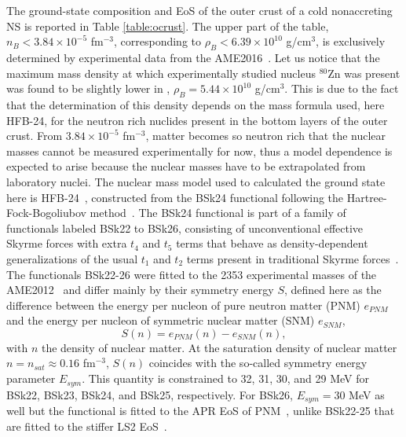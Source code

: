 The ground-state composition and EoS of the outer crust of a cold nonaccreting 
NS is reported in Table \ref{table:ocrust}. The upper part of the table, 
$n_B < 3.84 \times 10^{-5}$ fm$^{-3}$, {corresponding to $\rho_B < 6.39 \times
10^{10}$ g/cm$^3$}, is exclusively determined by experimental 
data from the AME2016~\cite{Huang2017}. {Let us notice that the maximum
  mass density at which experimentally studied nucleus $^{80}$Zn was present 
  was found to be slightly lower in \cite{Haensel1994}, 
  $\rho_B = 5.44 \times 10^{10}$ g/cm$^3$. This is due to the fact that the 
  determination of this density depends on the mass formula used, here
  HFB-24, for the neutron rich nuclides present in the bottom layers of the
outer crust.} From $3.84\times 10^{-5}$ 
fm$^{-3}$, matter becomes so neutron rich that the nuclear masses cannot be measured 
experimentally for now, thus a model dependence is expected 
to arise because the nuclear masses have to be extrapolated from laboratory nuclei. The
nuclear mass model used to calculated the ground state here is
HFB-24~\cite{Goriely2013}, constructed from the BSk24 functional following the
Hartree-Fock-Bogoliubov method~\cite{Samyn2002}. {The BSk24 functional is part
of a family of functionals labeled BSk22 to BSk26, consisting of unconventional
effective Skyrme forces with extra $t_4$ and $t_5$ terms that behave as
density-dependent generalizations of the usual $t_1$ and $t_2$ terms present in
traditional Skyrme forces~\cite{Vautherin1972,Chabanat1997}. 
The functionals BSk22-26 were fitted to the 2353
experimental masses of the AME2012~\cite{Audi2012} and
differ mainly by their symmetry energy $S$, defined here as the difference 
between the energy per nucleon of pure neutron matter (PNM) $e_{PNM}$ and the 
energy per nucleon of symmetric nuclear matter (SNM) $e_{SNM}$,
%
\begin{equation}
  S(n) = e_{PNM}(n) - e_{SNM}(n),
\end{equation}
%
with $n$ the density of nuclear matter. At the saturation density
of nuclear matter $n = n_{sat} \approx 0.16$ fm$^{-3}$, $S(n)$ coincides with
the so-called symmetry energy parameter $E_{sym}$. This quantity is constrained 
to 32, 31, 30, and 29 MeV for BSk22, BSk23, BSk24, and BSk25, respectively. For
BSk26, $E_{sym} = 30$ MeV as well but the functional is fitted to the APR EoS of
PNM~\cite{Akmal1998}, unlike BSk22-25 that are fitted to the stiffer LS2
EoS~\cite{Li2008}.}

